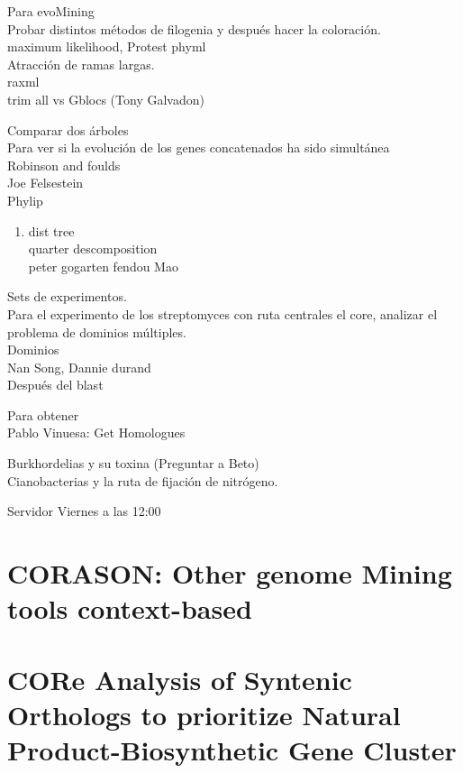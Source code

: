 \documentclass[12pt,twoside]{reedthesis}
\providecommand{\tightlist}{%
  \setlength{\itemsep}{0pt}\setlength{\parskip}{0pt}}
\begin{document}
  Para evoMining\\
  Probar distintos métodos de filogenia y después hacer la coloración.\\
  maximum likelihood, Protest phyml\\
  Atracción de ramas largas.\\
  raxml\\
  trim all vs Gblocs (Tony Galvadon)
  
  Comparar dos árboles\\
  Para ver si la evolución de los genes concatenados ha sido simultánea\\
  Robinson and foulds\\
  Joe Felsestein\\
  Phylip
  
  \begin{enumerate}
  \def\labelenumi{\arabic{enumi}.}
  \setcounter{enumi}{1}
  \tightlist
  \item
    dist tree\\
    quarter descomposition\\
    peter gogarten fendou Mao
  \end{enumerate}
  
  Sets de experimentos.\\
  Para el experimento de los streptomyces con ruta centrales el core,
  analizar el problema de dominios múltiples.\\
  Dominios\\
  Nan Song, Dannie durand\\
  Después del blast
  
  Para obtener\\
  Pablo Vinuesa: Get Homologues
  
  Burkhordelias y su toxina (Preguntar a Beto)\\
  Cianobacterias y la ruta de fijación de nitrógeno.
  
  Servidor Viernes a las 12:00
  
  \section{CORASON: Other genome Mining tools
  context-based}\label{corason-other-genome-mining-tools-context-based}
  
  \section{CORe Analysis of Syntenic Orthologs to prioritize Natural
  Product-Biosynthetic Gene
  Cluster}\label{core-analysis-of-syntenic-orthologs-to-prioritize-natural-product-biosynthetic-gene-cluster}
  
\end{document}
